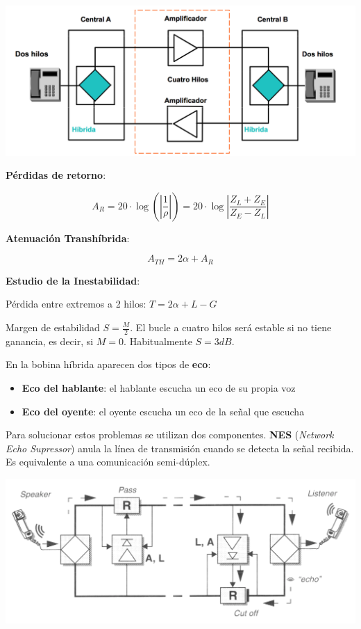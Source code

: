 \documentclass[10pt,portrait, twocolumn]{article}
\begin{document}
	\begin{center}
		\includegraphics[scale=0.2]{images/BobinaHibrida}
	\end{center}
	
\textbf{Pérdidas de retorno}:

	\begin{equation*}
		A_{R} =  20 \cdot \log \left( \left| \frac{1}{\rho} \right| \right) = 20 \cdot \log \left| \frac{Z_{L} + Z_{E}}{Z_{E} - Z_{L}} \right|
	\end{equation*}

\textbf{Atenuación Transhíbrida}:

	\begin{equation}
		A_{TH} = 2 \alpha + A_{R}
	\end{equation}
	
\textbf{Estudio de la Inestabilidad}:	
	
Pérdida entre extremos a 2 hilos: $T = 2 \alpha + L - G$

Margen de estabilidad $S = \frac{M}{2}$. El bucle a cuatro hilos será estable si no tiene ganancia, es decir, si $M = 0$. Habitualmente $S = 3 dB$.	
	
En la bobina híbrida aparecen dos tipos de \textbf{eco}:

	\begin{itemize}
		\item \textbf{Eco del hablante}: el hablante escucha un eco de su propia voz
		\item \textbf{Eco del oyente}: el oyente escucha un eco de la señal que escucha
	\end{itemize}
	
Para solucionar estos problemas se utilizan dos componentes. \textbf{NES} (\textit{Network Echo Supressor}) anula la línea de transmisión cuando se detecta la señal recibida. Es equivalente a una comunicación semi-dúplex.
	
	\begin{center}
		\includegraphics[scale=0.2]{images/NES}
	\end{center}
	
\end{document}
